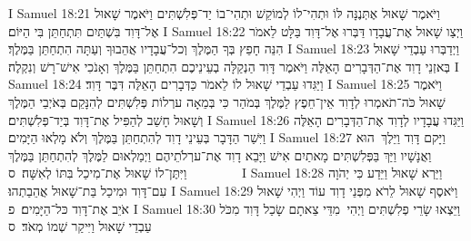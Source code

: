 I Samuel 18:21	וַיֹּאמֶר שָׁאוּל אֶתְּנֶנָּה לּוֹ וּתְהִי־לוֹ לְמוֹקֵשׁ וּתְהִי־בוֹ יַד־פְּלִשְׁתִּים וַיֹּאמֶר שָׁאוּל אֶל־דָּוִד בִּשְׁתַּיִם תִּתְחַתֵּן בִּי הַיּוֹם׃
I Samuel 18:22	וַיְצַו שָׁאוּל אֶת־עֲבָדָו דַּבְּרוּ אֶל־דָּוִד בַּלָּט לֵאמֹר הִנֵּה חָפֵץ בְּךָ הַמֶּלֶךְ וְכל־עֲבָדָיו אֲהֵבוּךָ וְעַתָּה הִתְחַתֵּן בַּמֶּלֶךְ׃
I Samuel 18:23	וַיְדַבְּרוּ עַבְדֵי שָׁאוּל בְּאזְנֵי דָוִד אֶת־הַדְּבָרִים הָאֵלֶּה וַיֹּאמֶר דָּוִד הַנְקַלָּה בְעֵינֵיכֶם הִתְחַתֵּן בַּמֶּלֶךְ וְאָנֹכִי אִישׁ־רָשׁ וְנִקְלֶה׃
I Samuel 18:24	וַיַּגִּדוּ עַבְדֵי שָׁאוּל לוֹ לֵאמֹר כַּדְּבָרִים הָאֵלֶּה דִּבֶּר דָּוִד׃
I Samuel 18:25	וַיֹּאמֶר שָׁאוּל כֹּה־תֹאמְרוּ לְדָוִד אֵין־חֵפֶץ לַמֶּלֶךְ בְּמֹהַר כִּי בְּמֵאָה ערְלוֹת פְּלִשְׁתִּים לְהִנָּקֵם בְּאֹיְבֵי הַמֶּלֶךְ וְשָׁאוּל חָשַׁב לְהַפִּיל אֶת־דָּוִד בְּיַד־פְּלִשְׁתִּים׃
I Samuel 18:26	וַיַּגִּדוּ עֲבָדָיו לְדָוִד אֶת־הַדְּבָרִים הָאֵלֶּה וַיִּשַׁר הַדָּבָר בְּעֵינֵי דָוִד לְהִתְחַתֵּן בַּמֶּלֶךְ וְלֹא מָלְאוּ הַיָּמִים׃
I Samuel 18:27	וַיָּקם דָּוִד וַיֵּלֶךְ  הוּא וַאֲנָשָׁיו וַיַּךְ בַּפְּלִשְׁתִּים מָאתַיִם אִישׁ וַיָּבֵא דָוִד אֶת־ערְלֹתֵיהֶם וַיְמַלְאוּם לַמֶּלֶךְ לְהִתְחַתֵּן בַּמֶּלֶךְ וַיִּתֶּן־לוֹ שָׁאוּל אֶת־מִיכַל בִּתּוֹ לְאִשָּׁה׃ {ס}        
I Samuel 18:28	וַיַּרְא שָׁאוּל וַיֵּדַע כִּי יְהֹוָה עִם־דָּוִד וּמִיכַל בַּת־שָׁאוּל אֲהֵבַתְהוּ׃
I Samuel 18:29	וַיֹּאסֶף שָׁאוּל לֵרֹא מִפְּנֵי דָוִד עוֹד וַיְהִי שָׁאוּל אֹיֵב אֶת־דָּוִד כּל־הַיָּמִים׃ {פ}
I Samuel 18:30	וַיֵּצְאוּ שָׂרֵי פְלִשְׁתִּים וַיְהִי  מִדֵּי צֵאתָם שָׂכַל דָּוִד מִכֹּל עַבְדֵי שָׁאוּל וַיִּיקַר שְׁמוֹ מְאֹד׃ {ס}        
